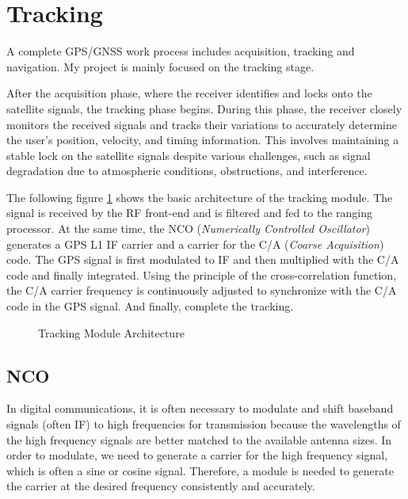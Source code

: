 \section{Tracking}
A complete GPS/GNSS work process includes acquisition, tracking and navigation. My project is mainly focused on the tracking stage.

After the acquisition phase, where the receiver identifies and locks onto the satellite signals, the tracking phase begins. During this phase, the receiver closely monitors the received signals and tracks their variations to accurately determine the user's position, velocity, and timing information. This involves maintaining a stable lock on the satellite signals despite various challenges, such as signal degradation due to atmospheric conditions, obstructions, and interference.

The following figure \ref{fig:tracking_digram} shows the basic architecture of the tracking module. The signal is received by the RF front-end and is filtered and fed to the ranging processor. At the same time, the NCO (\textit{Numerically Controlled Oscillator}) generates a GPS L1 IF carrier and a carrier for the C/A (\textit{Coarse Acquisition}) code. The GPS signal is first modulated to IF and then multiplied with the C/A code and finally integrated. Using the principle of the cross-correlation function, the C/A carrier frequency is continuously adjusted to synchronize with the C/A code in the GPS signal. And finally, complete the tracking\cite{RN151}.
\begin{figure}[!h]
    \centering
    
    \caption{Tracking Module Architecture}
    \label{fig:tracking_digram}
\end{figure}

\subsection{NCO}
In digital communications, it is often necessary to modulate and shift baseband signals (often IF) to high frequencies for transmission because the wavelengths of the high frequency signals are better matched to the available antenna sizes. In order to modulate, we need to generate a carrier for the high frequency signal, which is often a sine or cosine signal. Therefore, a module is needed to generate the carrier at the desired frequency consistently and accurately.

